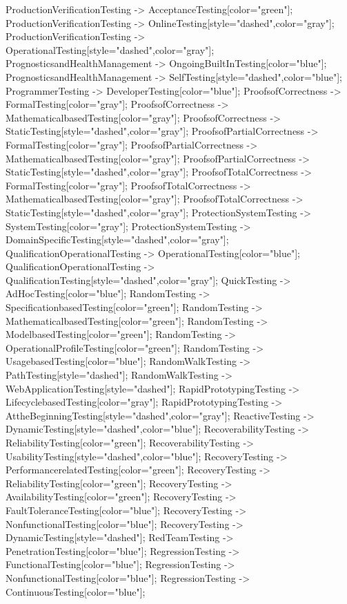 \documentclass{article}
\begin{document}
{ProductionVerificationTesting -> AcceptanceTesting[color="green"];
ProductionVerificationTesting -> OnlineTesting[style="dashed",color="gray"];
ProductionVerificationTesting -> OperationalTesting[style="dashed",color="gray"];
PrognosticsandHealthManagement -> OngoingBuiltInTesting[color="blue"];
PrognosticsandHealthManagement -> SelfTesting[style="dashed",color="blue"];
ProgrammerTesting -> DeveloperTesting[color="blue"];
ProofsofCorrectness -> FormalTesting[color="gray"];
ProofsofCorrectness -> MathematicalbasedTesting[color="gray"];
ProofsofCorrectness -> StaticTesting[style="dashed",color="gray"];
ProofsofPartialCorrectness -> FormalTesting[color="gray"];
ProofsofPartialCorrectness -> MathematicalbasedTesting[color="gray"];
ProofsofPartialCorrectness -> StaticTesting[style="dashed",color="gray"];
ProofsofTotalCorrectness -> FormalTesting[color="gray"];
ProofsofTotalCorrectness -> MathematicalbasedTesting[color="gray"];
ProofsofTotalCorrectness -> StaticTesting[style="dashed",color="gray"];
ProtectionSystemTesting -> SystemTesting[color="gray"];
ProtectionSystemTesting -> DomainSpecificTesting[style="dashed",color="gray"];
QualificationOperationalTesting -> OperationalTesting[color="blue"];
QualificationOperationalTesting -> QualificationTesting[style="dashed",color="gray"];
QuickTesting -> AdHocTesting[color="blue"];
RandomTesting -> SpecificationbasedTesting[color="green"];
RandomTesting -> MathematicalbasedTesting[color="green"];
RandomTesting -> ModelbasedTesting[color="green"];
RandomTesting -> OperationalProfileTesting[color="green"];
RandomTesting -> UsagebasedTesting[color="blue"];
RandomWalkTesting -> PathTesting[style="dashed"];
RandomWalkTesting -> WebApplicationTesting[style="dashed"];
RapidPrototypingTesting -> LifecyclebasedTesting[color="gray"];
RapidPrototypingTesting -> AttheBeginningTesting[style="dashed",color="gray"];
ReactiveTesting -> DynamicTesting[style="dashed",color="blue"];
RecoverabilityTesting -> ReliabilityTesting[color="green"];
RecoverabilityTesting -> UsabilityTesting[style="dashed",color="blue"];
RecoveryTesting -> PerformancerelatedTesting[color="green"];
RecoveryTesting -> ReliabilityTesting[color="green"];
RecoveryTesting -> AvailabilityTesting[color="green"];
RecoveryTesting -> FaultToleranceTesting[color="blue"];
RecoveryTesting -> NonfunctionalTesting[color="blue"];
RecoveryTesting -> DynamicTesting[style="dashed"];
RedTeamTesting -> PenetrationTesting[color="blue"];
RegressionTesting -> FunctionalTesting[color="blue"];
RegressionTesting -> NonfunctionalTesting[color="blue"];
RegressionTesting -> ContinuousTesting[color="blue"];
}
\end{document}
